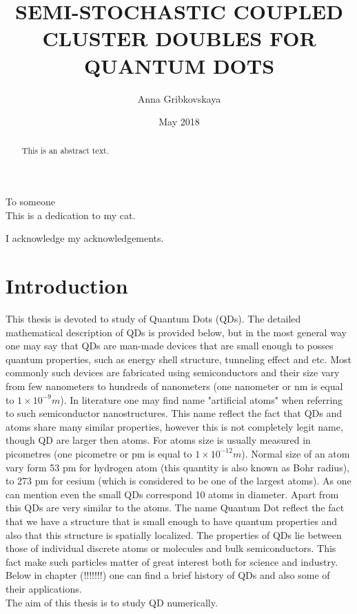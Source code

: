 \documentclass[twoside,english]{uiofysmaster}
\author{Anna Gribkovskaya}
\title{\uppercase{Semi-stochastic Coupled Cluster Doubles for Quantum Dots}}
\date{May 2018}
\theoremstyle{definition}
\begin{document}
\begin{titlepage}
\maketitle
\end{titlepage}
\begin{abstract}
	This is an abstract text.
\end{abstract}

\begin{dedication}
	To someone
	\\\vspace{12pt}
	This is a dedication to my cat.
\end{dedication}
\begin{acknowledgements}
	I acknowledge my acknowledgements.
\end{acknowledgements}
\tableofcontents

\chapter*{Introduction}
This thesis is devoted to study of Quantum Dots (QDs). The detailed mathematical description of QDs is provided below, but in the most general way one may say that QDs are man-made devices that are small enough to posses quantum properties, such as energy shell structure, tunneling effect and etc. Most commonly such devices are fabricated using semiconductors and their size vary from few nanometers to hundreds of nanometers (one nanometer or nm is equal to $1\times 10^{-9} m$). In literature one may find name "artificial atoms" when referring to such  semiconductor nanostructures. This name reflect the fact that QDs and atoms share many similar properties, however this is not completely legit name, though QD are larger then atoms. For atoms size is usually measured in picometres  (one picometre or pm is equal to $1\times 10^{-12} m$).  Normal size of an atom vary form 53 pm for hydrogen atom (this quantity is also known as Bohr radius), to  273 pm for cesium (which is considered to be one of the largest atoms). As one can mention even the small QDs correspond 10 atoms in diameter. Apart from this QDs are very similar to the atoms. The name Quantum Dot reflect the fact that we have a structure that is small enough to have quantum properties and also that this structure is spatially localized. The properties of QDs lie between those of individual discrete atoms or molecules and bulk semiconductors. This fact make such particles matter of great interest both for science and industry. Below in chapter (!!!!!!!) one can find a brief history of QDs and also  some of their applications.  \\
The aim of this thesis is to study QD numerically. 
\end{document}
